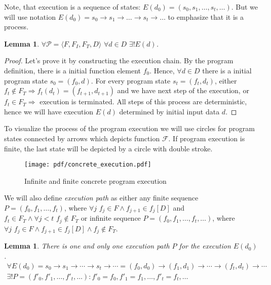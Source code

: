 \documentclass[fleqn,oneside,a4]{article}
\newcommand{\Ra}{\Rightarrow}
\newcommand{\ra}{\rightarrow}
\newcommand{\term}[1]{\textit{#1}\index{#1}}
\newtheorem{lemma}[theorem]{Lemma}
\begin{document}
Note, that execution is a sequence of states:
$E(d_0) = (s_0, s_1, \dots, s_t, \dots)$.
But we will use notation
$E(d_0) = s_0 \ra s_1 \ra \dots \ra s_t \ra \dots$
to emphasize that it is a process.

\begin{lemma}
    \label{exists_one_execution}
    $\forall \mathcal{P} = \langle F, F_I, F_T, D \rangle \,\,
    \forall d \in D \,\, \exists! E(d)$.
\end{lemma}

\begin{proof}
    Let's prove it by constructing the execution chain.
    By the program definition, there is a initial function element $f_0$.
    Hence, $\forall d \in D$
    there is a initial program state $s_0 = (f_0, d)$.
    For every program state $s_t = (f_t, d_t)$,
    either $f_t \notin F_T \Ra f_t(d_t) = (f_{t + 1}, d_{t + 1})$
        and we have next step of the execution,
    or $f_t \in F_T \Ra$ execution is terminated.
    All steps of this process are deterministic,
    hence we will have execution $E(d)$ determined by initial input data $d$.
\end{proof}

To visualize the process of the program execution we will use circles
for program states connected by arrows which depicts function $\mathcal{F}$.
If program execution is finite, the last state will be depicted by
a circle with double stroke.

\begin{figure}[h!]
    \begin{center}
        \texttt{[image: pdf/concrete\_execution.pdf]}
    \end{center}
    \caption{Infinite and finite concrete program execution}
\end{figure}

We will also define \term{execution path} as either any finite sequence
$P = (f_0, f_1, \dots, f_t)$, where
$\forall j \,\, f_j \in F \land f_{j + 1} \in f_j[D]$
and $f_t \in F_T \land \forall j < t \,\, f_j \notin F_T$
or infinite sequence $P = (f_0, f_1, \dots, f_t, \dots)$, where
$\forall j \,\, f_j \in F \land f_{j + 1} \in f_j[D] \land f_j \notin F_T$.

\begin{lemma}
    There is one and only one execution path $P$ for the execution $E(d_0)$.
    \[ \begin{array}{c}
    \forall E(d_0) = s_0 \ra s_1 \ra \cdots \ra s_t \ra \cdots =
        (f_0, d_0) \ra (f_1, d_1) \ra \cdots \ra (f_t, d_t) \ra \cdots \\
    \exists! P = (f'_0, f'_1, \dots, f'_t, \dots):
        f'_0 = f_0, f'_1 = f_1, \dots, f'_t = f_t, \dots
    \end{array} \]
\end{lemma}
\end{document}

